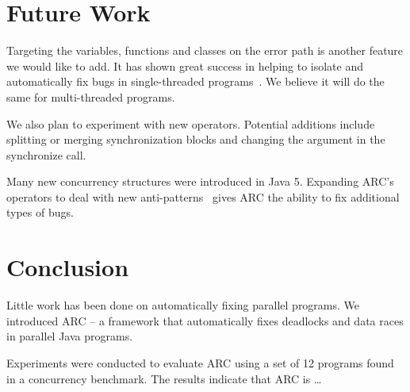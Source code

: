 \documentclass{llncs}
\begin{document}

\section{Future Work}
\label{sec:future_work}

Targeting the variables, functions and classes on the error path is another
feature we would like to add. It has shown great success in helping to isolate
and automatically fix bugs in single-threaded programs~\cite{FNWG09, NWLF09,
WFGN10, GNFW11}. We believe it will do the same for multi-threaded programs.

We also plan to experiment with new operators. Potential additions include
splitting or merging synchronization blocks and changing the argument in the
synchronize call.

Many new concurrency structures were introduced in Java 5. Expanding ARC's
operators to deal with new anti-patterns~\cite{BJ09, BCD06} gives ARC the
ability to fix additional types of bugs.

\section{Conclusion}
\label{sec:conclusion}

Little work has been done on automatically fixing parallel programs. We
introduced ARC -- a framework that automatically fixes deadlocks and data races
in parallel Java programs.

Experiments were conducted to evaluate ARC using a set of 12 programs found in
a concurrency benchmark. The results indicate that ARC is \ldots %



\end{document}

